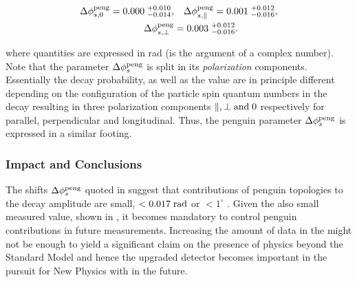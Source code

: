 
\begin{align}
\label{app_delta_phis_result}
  \Delta\phi^{\rm peng}_{s,{0}}         = 0.000 \; ^{+0.010}_{-0.014}, &\quad  \Delta\phi^{\rm peng}_{s,{\parallel}} = 0.001 \; ^{+0.012}_{-0.016}, \nonumber \\
  \Delta\phi^{\rm peng}_{s,{\perp}}     &= 0.003 \; ^{+0.012}_{-0.016}.
\end{align}

\noindent where quantities are expressed in rad (\phis is the argument of a complex number).
Note that the parameter $\Delta\phi_{s}^{\tiny\text{peng}}$ is split in its {\it polarization}
components. Essentially the \BsJpsiPhi decay probability, as well as the \phis value
are in principle different depending on the configuration of the particle spin
quantum numbers in the \BsJpsiPhi decay resulting in three polarization components
$\parallel,\perp {\rm and}\; 0$ respectively for parallel, perpendicular and longitudinal.
Thus, the penguin parameter $\Delta\phi_{s}^{\tiny\text{peng}}$ is expressed in a similar footing.


\subsubsection{Impact and Conclusions}

The shifts $\Delta\phi_{s}^{\tiny\text{peng}}$ quoted in 
suggest that contributions of penguin topologies to the \BsJpsiPhi decay amplitude are
small, $<0.017 \; {\rm rad}$ or $<1^\circ$ . Given the also small \phis measured value, shown in ,
it becomes mandatory to control penguin contributions in future \phis measurements.
Increasing the amount of data in the \lhc \runtwo might not be enough to yield
a significant claim on the presence of physics beyond the Standard Model and hence
the upgraded \lhcb detector becomes important in the pursuit for New Physics with
\phis in the future.

%
%
%
